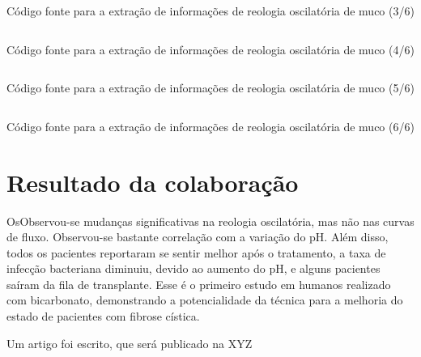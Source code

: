		\begin{listing}[H]
			\inputminted{python}{./python/extracao_muco3.py}
			\caption{Código fonte para a extração de informações de reologia oscilatória de muco (3/6)} 
			\label{lst:extracao_muco3}
		\end{listing}
		
		\begin{listing}[H]
			\inputminted{python}{./python/extracao_muco4.py}
			\caption{Código fonte para a extração de informações de reologia oscilatória de muco (4/6)} 
			\label{lst:extracao_muco4}
		\end{listing}
		
		\begin{listing}[H]
			\inputminted{python}{./python/extracao_muco5.py}
			\caption{Código fonte para a extração de informações de reologia oscilatória de muco (5/6)}
			\label{lst:extracao_muco5}
		\end{listing}
		
		\begin{listing}[H]
			\inputminted{python}{./python/extracao_muco6.py}
			\caption{Código fonte para a extração de informações de reologia oscilatória de muco (6/6)} 
			\label{lst:extracao_muco6}
		\end{listing}
		
		\chapter{Resultado da colaboração}
		
		OsObservou-se mudanças significativas na reologia oscilatória, mas não nas curvas de fluxo. Observou-se bastante correlação com a variação do pH. Além disso, todos os pacientes reportaram se sentir melhor após o tratamento, a taxa de infecção bacteriana diminuiu, devido ao aumento do pH, e alguns pacientes saíram da fila de transplante. Esse é o primeiro estudo em humanos realizado com bicarbonato, demonstrando a potencialidade da técnica para a melhoria do estado de pacientes com fibrose cística.
		
		Um artigo foi escrito, que será publicado na XYZ %
		
		
